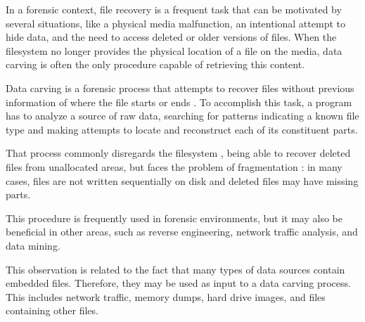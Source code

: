 In a forensic context, file recovery is a frequent task that can be motivated by several situations, like a physical media malfunction, an intentional attempt to hide data, and the need to access deleted or older versions of files. When the filesystem no longer provides the physical location of a file on the media, data carving is often the only procedure capable of retrieving this content.

Data carving is a forensic process that attempts to recover files without previous information of where the file starts or ends \cite{garfinkel_carving_2007}.
To accomplish this task, a program has to analyze a source of raw data, searching for patterns indicating a known file type and making attempts to locate and reconstruct each of its constituent parts.

That process commonly disregards the filesystem \cite{veenman_statistical_2007}, being able to recover deleted files from unallocated areas, but faces the problem of fragmentation \cite{veenman_statistical_2007}  \cite{pal_evolution_2009}: in many cases, files are not written sequentially on disk and deleted files may have missing parts.

This procedure is frequently used in forensic environments, but it may also be beneficial in other areas, such as reverse engineering, network traffic analysis, and data mining.

This observation is related to the fact that many types of data sources contain embedded files. Therefore, they may be used as input to a data carving process. This includes network traffic, memory dumps, hard drive images, and files containing other files.
